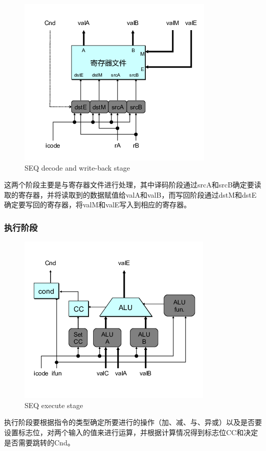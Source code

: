 \begin{figure}[htbp]
\centering
\includegraphics{img/seq-decode.png}
\caption{SEQ decode and write-back stage}
\end{figure}

这两个阶段主要是与寄存器文件进行处理，其中译码阶段通过srcA和srcB确定要读取的寄存器，并将读取到的数据赋值给valA和valB，而写回阶段通过dstM和dstE确定要写回的寄存器，将valM和valE写入到相应的寄存器。

\subsubsection{执行阶段}\label{ux6267ux884cux9636ux6bb5}

\begin{figure}[htbp]
\centering
\includegraphics{img/seq-execute.png}
\caption{SEQ execute stage}
\end{figure}

执行阶段要根据指令的类型确定所要进行的操作（加、减、与、异或）以及是否要设置标志位，对两个输入的值来进行运算，并根据计算情况得到标志位CC和决定是否需要跳转的Cnd。

